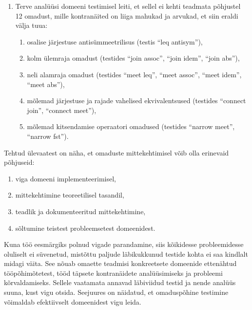 \documentclass[../thesis.tex]{subfiles}
\begin{document}
\begin{enumerate}
	\item Terve analüüsi domeeni testimisel leiti, et sellel ei kehti teadmata põhjustel 12 omadust, mille kontranäited on liiga mahukad ja arvukad, et siin eraldi välja tuua:
	\begin{enumerate}[nosep]
		\item osalise järjestuse antisümmeetrilisus (testis \enquote{leq antisym}),
		\item kolm ülemraja omadust (testides \enquote{join assoc}, \enquote{join idem}, \enquote{join abs}),
		\item neli alamraja omadust (testides \enquote{meet leq}, \enquote{meet assoc}, \enquote{meet idem}, \enquote{meet abs}),
		\item mõlemad järjestuse ja rajade vahelised ekvivalentsused (testides \enquote{connect join}, \enquote{connect meet}),
		\item mõlemad kitsendamise operaatori omadused (testides \enquote{narrow meet}, \enquote{narrow fst}).
	\end{enumerate}
\end{enumerate}
Tehtud ülevaatest on näha, et omaduste mittekehtimisel võib olla erinevaid põhjuseid:
\begin{enumerate}[noitemsep]
	\item viga domeeni implementeerimisel,
	\item mittekehtimine teoreetilisel tasandil,
	\item teadlik ja dokumenteeritud mittekehtimine,
	\item sõltumine teistest probleemsetest domeenidest.
\end{enumerate}

Kuna töö eesmärgiks polnud vigade parandamine, siis kõikidesse probleemidesse oluliselt ei süvenetud, mistõttu paljude läbikukkunud testide kohta ei saa kindlalt midagi väita. See nõuab omaette teadmisi konkreetsete domeenide ettenähtud tööpõhimõtetest, tööd täpsete kontranäidete analüüsimiseks ja probleemi kõrvaldamiseks. Sellele vaatamata annavad läbiviidud testid ja nende analüüs suuna, kust vigu otsida. Seejuures on näidatud, et omaduspõhine testimine võimaldab efektiivselt domeenidest vigu leida.
\end{document}
